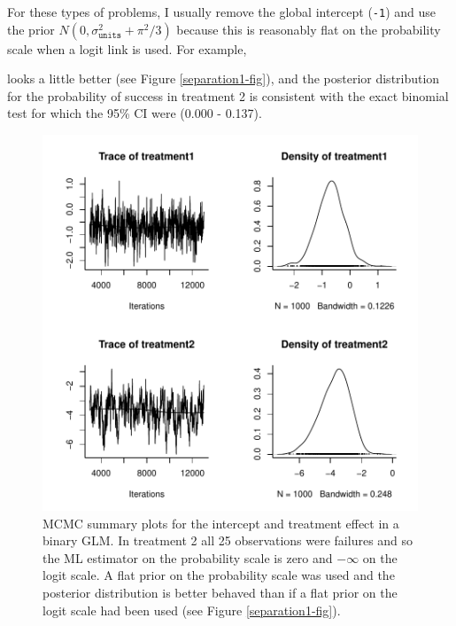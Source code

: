 \documentclass{article}
\begin{document}
For these types of problems, I usually remove the global intercept (\texttt{-1}) and use the prior $N(0, \sigma^{2}_{\texttt{units}}+\pi^2/3)$ because this is reasonably flat on the probability scale when a logit link is used. For example,

\begin{Schunk}
\end{Schunk}

looks a little better (see Figure \ref{separation1-fig}), and the posterior distribution for the probability of success in treatment 2 is consistent with the exact binomial test for which the 95\% CI were (0.000 - 0.137).



\begin{figure}[!h]
\begin{center}
\includegraphics{Lecture2-082}
\end{center}
\caption{MCMC summary plots for the intercept and treatment effect in a binary GLM. In treatment 2 all 25 observations were failures and so the ML estimator on the probability scale is zero and $-\infty$ on the logit scale. A flat prior on the probability scale was used and the posterior distribution is better behaved than if a flat prior on the logit scale had been used (see Figure \ref{separation1-fig}).}
\label{separation2-fig}
\end{figure}
\end{document}
